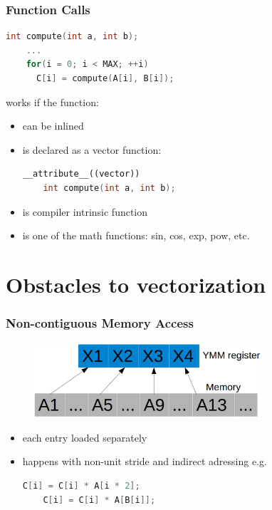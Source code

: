 \documentclass{beamer}
\begin{document}
\begin{frame}[fragile]
  \frametitle{Function Calls}
     
     \begin{lstlisting}[language=C++]
	int compute(int a, int b);
	...
	for(i = 0; i < MAX; ++i) 
	  C[i] = compute(A[i], B[i]);   
     \end{lstlisting}
    
    works if the function:
    \begin{itemize}
     \item can be inlined
     \item is declared as a vector function:
     \begin{lstlisting}[language=C++]
	__attribute__((vector))
	int compute(int a, int b);
     \end{lstlisting}

     \item is compiler intrinsic function
     \item is one of the math functions: sin, cos, exp, pow, etc.
    \end{itemize}    
\end{frame}

\section{Obstacles to vectorization}

\begin{frame}[fragile]
  \frametitle{Non-contiguous Memory Access}
  \begin{figure}
    \begin{center}
      \includegraphics[width=0.75\textwidth]{non-contigous}
    \end{center}
  \end{figure}
  
  \begin{itemize}
   \item each entry loaded separately
   \item happens with non-unit stride and indirect adressing e.g.
   \begin{lstlisting}[language=C++]
    C[i] = C[i] * A[i * 2];
    C[i] = C[i] * A[B[i]];
   \end{lstlisting}

  \end{itemize}


  
\end{frame}
\end{document}
